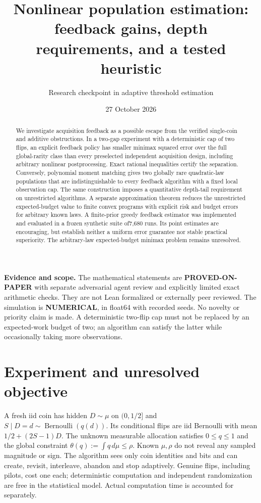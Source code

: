 \documentclass[11pt]{article}
\title{Nonlinear population estimation:\\feedback gains, depth requirements, and a tested heuristic}
\author{Research checkpoint in adaptive threshold estimation}
\date{27 October 2026}
\begin{document}
\maketitle
\begin{abstract}
We investigate acquisition feedback as a possible escape from the verified
single-coin and additive obstructions. In a two-gap experiment with a
deterministic cap of two flips, an explicit feedback policy has smaller
minimax squared error over the full global-rarity class than every
preselected independent acquisition design, including arbitrary nonlinear
postprocessing. Exact rational inequalities certify the separation.
Conversely, polynomial moment matching gives two globally rare quadratic-law
populations that are indistinguishable to every feedback algorithm with a
fixed local observation cap. The same construction imposes a quantitative
depth-tail requirement on unrestricted algorithms. A separate approximation
theorem reduces the unrestricted expected-budget value to finite convex
programs with explicit risk and budget errors for arbitrary known laws.
A finite-prior greedy
feedback estimator was implemented and evaluated in a frozen synthetic
suite of7,680 runs. Its point estimates are encouraging, but establish
neither a uniform error guarantee nor stable practical superiority.
The arbitrary-law expected-budget minimax problem remains unresolved.
\end{abstract}

\noindent\textbf{Evidence and scope.}
The mathematical statements are \textbf{PROVED-ON-PAPER} with separate
adversarial agent review and explicitly limited exact arithmetic checks.
They are not Lean formalized or externally peer reviewed. The simulation
is \textbf{NUMERICAL}, in float64 with recorded seeds. No novelty or priority
claim is made. A deterministic two-flip cap must not be replaced by an
expected-work budget of two; an algorithm can satisfy the latter while
occasionally taking more observations.

\section{Experiment and unresolved objective}
A fresh iid coin has hidden $D\sim\mu$ on $(0,1/2]$ and
$S\mid D=d\sim\operatorname{Bernoulli}(q(d))$. Its conditional flips are iid
Bernoulli with mean $1/2+(2S-1)D$. The unknown measurable allocation satisfies
$0\le q\le1$ and the global constraint $\theta(q):=\int q\,d\mu\le\rho$.
Known $\mu,\rho$ do not reveal any sampled magnitude or sign. The algorithm
sees only coin identities and bits and can create, revisit, interleave,
abandon and stop adaptively. Genuine flips, including pilots, cost one each;
deterministic computation and independent randomization are free in the
statistical model. Actual computation time is accounted for separately.
\end{document}
